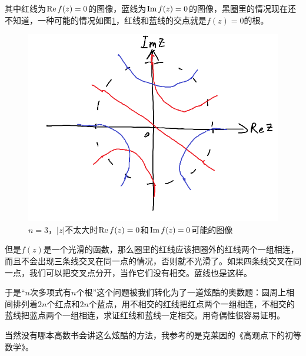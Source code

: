 其中红线为$\mathrm{Re}\mathop{}\! f(z)=0$的图像，蓝线为$\mathrm{Im}\mathop{}\! f(z)=0$的图像，黑圈里的情况现在还不知道，一种可能的情况如图\ref{fig-poly-root-inner}，红线和蓝线的交点就是$f(z)=0$的根。
\begin{figure}[htb]
\centering
\includegraphics[scale=0.5]{fig/poly-root-inner}
\caption{$n=3$，$|z|$不太大时$\mathrm{Re}\mathop{}\! f(z)=0$和$\mathrm{Im}\mathop{}\! f(z)=0$可能的图像}
\label{fig-poly-root-inner}
\end{figure}

但是$f(z)$是一个光滑的函数，那么圈里的红线应该把圈外的红线两个一组相连，而且不会出现三条线交叉在同一点的情况，否则就不光滑了。如果四条线交叉在同一点，我们可以把交叉点分开，当作它们没有相交。蓝线也是这样。

于是“$n$次多项式有$n$个根”这个问题被我们转化为了一道炫酷的奥数题：圆周上相间排列着$2n$个红点和$2n$个蓝点，用不相交的红线把红点两个一组相连，不相交的蓝线把蓝点两个一组相连，求证红线和蓝线一定相交。用奇偶性很容易证明。

当然没有哪本高数书会讲这么炫酷的方法，我参考的是克莱因的《高观点下的初等数学》。
